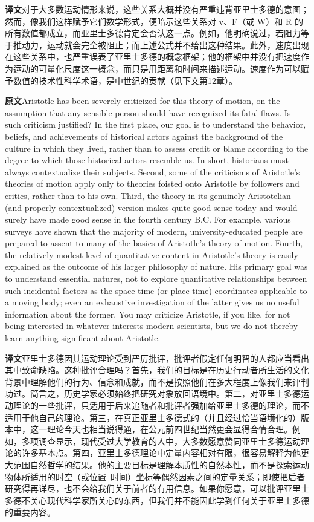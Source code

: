 \documentclass[UTF8,zihao=-4]{ctexart}
\newcommand{\BodyFont}{\fontsize{10.5pt}{15.5pt}\selectfont}
\newcommand{\origlabel}{\textbf{原文}\quad}
\newcommand{\translabel}{\textbf{译文}\quad}
\newcommand{\orig}{\par\noindent\begingroup\BodyFont\origlabel}
\newcommand{\zhline}[1]{\par\endgroup\noindent\begingroup\BodyFont\translabel #1\par\endgroup\vspace{0.35em}}
\begin{document}
\zhline{对于大多数运动情形来说，这些关系大概并没有严重违背亚里士多德的意图；然而，像我们这样赋予它们数学形式，便暗示这些关系对 v、F（或 W）和 R 的所有数值都成立，而亚里士多德肯定会否认这一点。例如，他明确说过，若阻力等于推动力，运动就会完全被阻止；而上述公式并不给出这种结果。此外，速度出现在这些关系中，也严重误表了亚里士多德的概念框架；他的框架中并没有把速度作为运动的可量化尺度这一概念，而只是用距离和时间来描述运动。速度作为可以赋予数值的技术性科学术语，是中世纪的贡献（见下文第12章）。}

\orig Aristotle has been severely criticized for this theory of motion, on the assumption that any sensible person should have recognized its fatal flaws. Is such criticism justified? In the first place, our goal is to understand the behavior, beliefs, and achievements of historical actors against the background of the culture in which they lived, rather than to assess credit or blame according to the degree to which those historical actors resemble us. In short, historians must always contextualize their subjects. Second, some of the criticisms of Aristotle's theories of motion apply only to theories foisted onto Aristotle by followers and critics, rather than to his own. Third, the theory in its genuinely Aristotelian (and properly contextualized) version makes quite good sense today and would surely have made good sense in the fourth century B.C. For example, various surveys have shown that the majority of modern, university-educated people are prepared to assent to many of the basics of Aristotle's theory of motion. Fourth, the relatively modest level of quantitative content in Aristotle's theory is easily explained as the outcome of his larger philosophy of nature. His primary goal was to understand essential natures, not to explore quantitative relationships between such incidental factors as the space-time (or place-time) coordinates applicable to a moving body; even an exhaustive investigation of the latter gives us no useful information about the former. You may criticize Aristotle, if you like, for not being interested in whatever interests modern scientists, but we do not thereby learn anything significant about Aristotle.

\zhline{亚里士多德因其运动理论受到严厉批评，批评者假定任何明智的人都应当看出其中致命缺陷。这种批评合理吗？首先，我们的目标是在历史行动者所生活的文化背景中理解他们的行为、信念和成就，而不是按照他们在多大程度上像我们来评判功过。简言之，历史学家必须始终把研究对象放回语境中。第二，对亚里士多德运动理论的一些批评，只适用于后来追随者和批评者强加给亚里士多德的理论，而不适用于他自己的理论。第三，在真正亚里士多德式的（并且经过恰当语境化的）版本中，这一理论今天也相当说得通，在公元前四世纪当然更会显得合情合理。例如，多项调查显示，现代受过大学教育的人中，大多数愿意赞同亚里士多德运动理论的许多基本点。第四，亚里士多德理论中定量内容相对有限，很容易解释为他更大范围自然哲学的结果。他的主要目标是理解本质性的自然本性，而不是探索运动物体所适用的时空（或位置--时间）坐标等偶然因素之间的定量关系；即使把后者研究得再详尽，也不会给我们关于前者的有用信息。如果你愿意，可以批评亚里士多德不关心现代科学家所关心的东西，但我们并不能因此学到任何关于亚里士多德的重要内容。}
\end{document}
